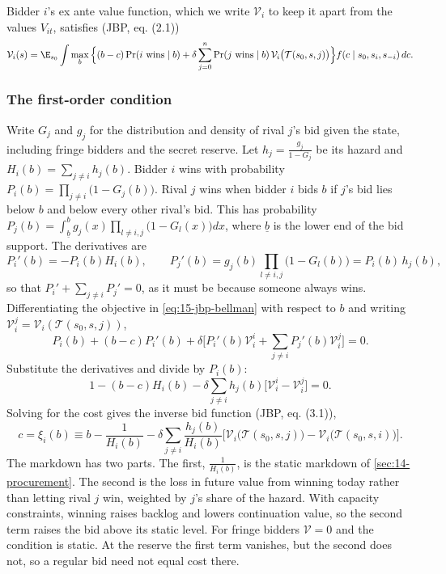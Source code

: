 Bidder $i$'s ex ante value function, which we write $\mathcal V_i$ to keep it apart from the values
$V_{it}$, satisfies (JBP, eq. (2.1))
\begin{equation}\label{eq:15-jbp-bellman}
\mathcal V_i(s)=\E_{s_0}\int\max_b\Big\{(b-c)\Pr(i\text{ wins}\mid b)+\delta\sum_{j=0}^{n}\Pr(j\text{ wins}\mid b)\,\mathcal V_i\big(\mathcal T(s_0,s,j)\big)\Big\}f(c\mid s_0,s_i,s_{-i})\,dc .
\end{equation}

\subsubsection{The first-order condition}

Write $G_j$ and $g_j$ for the distribution and density of rival $j$'s bid given the state, including
fringe bidders and the secret reserve. Let $h_j=\frac{g_j}{1-G_j}$ be its hazard and
$H_i(b)=\sum_{j\neq i}h_j(b)$. Bidder $i$ wins with probability $P_i(b)=\prod_{j\neq i}\big(1-G_j(b)\big)$.
Rival $j$ wins when bidder $i$ bids $b$ if $j$'s bid lies below $b$ and below every other rival's bid.
This has probability $P_j(b)=\int_{\underline b}^{b}g_j(x)\prod_{l\neq i,j}\big(1-G_l(x)\big)dx$, where
$\underline b$ is the lower end of the bid support. The derivatives are
\[
P_i'(b)=-P_i(b)H_i(b),\qquad P_j'(b)=g_j(b)\prod_{l\neq i,j}\big(1-G_l(b)\big)=P_i(b)\,h_j(b),
\]
so that $P_i'+\sum_{j\neq i}P_j'=0$, as it must be because someone always wins.
Differentiating the objective in \eqref{eq:15-jbp-bellman} with respect to $b$ and writing
$\mathcal V_i^j=\mathcal V_i(\mathcal T(s_0,s,j))$,
\[
P_i(b)+(b-c)P_i'(b)+\delta\Big[P_i'(b)\mathcal V_i^i+\sum_{j\neq i}P_j'(b)\mathcal V_i^j\Big]=0 .
\]
Substitute the derivatives and divide by $P_i(b)$:
\[
1-(b-c)H_i(b)-\delta\sum_{j\neq i}h_j(b)\big[\mathcal V_i^i-\mathcal V_i^j\big]=0 .
\]
Solving for the cost gives the inverse bid function (JBP, eq. (3.1)),
\begin{equation}\label{eq:15-jbp-foc}
c=\xi_i(b)\equiv b-\frac{1}{H_i(b)}-\delta\sum_{j\neq i}\frac{h_j(b)}{H_i(b)}\Big[\mathcal V_i\big(\mathcal T(s_0,s,j)\big)-\mathcal V_i\big(\mathcal T(s_0,s,i)\big)\Big].
\end{equation}
The markdown has two parts. The first, $\frac{1}{H_i(b)}$, is the static markdown of
\cref{sec:14-procurement}. The second is the loss in future value from winning today rather than letting
rival $j$ win, weighted by $j$'s share of the hazard. With capacity constraints, winning raises
backlog and lowers continuation value, so the second term raises the bid above its static level.
For fringe bidders $\mathcal V=0$ and the condition is static. At the reserve the first term vanishes, but the
second does not, so a regular bid need not equal cost there.

